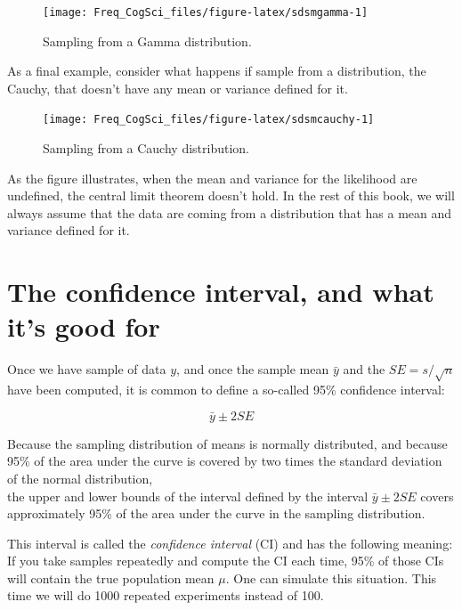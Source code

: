 \documentclass[12pt,]{krantz}
\begin{document}
\begin{figure}
\texttt{[image: Freq\_CogSci\_files/figure-latex/sdsmgamma-1]} \caption{Sampling from a Gamma distribution.}\label{fig:sdsmgamma}
\end{figure}

As a final example, consider what happens if sample from a distribution, the Cauchy, that doesn't have any mean or variance defined for it.

\begin{figure}
\texttt{[image: Freq\_CogSci\_files/figure-latex/sdsmcauchy-1]} \caption{Sampling from a Cauchy distribution.}\label{fig:sdsmcauchy}
\end{figure}

As the figure illustrates, when the mean and variance for the likelihood are undefined, the central limit theorem doesn't hold. In the rest of this book, we will always assume that the data are coming from a distribution that has a mean and variance defined for it.

\hypertarget{the-confidence-interval-and-what-its-good-for}{%
\section{The confidence interval, and what it's good for}\label{the-confidence-interval-and-what-its-good-for}}

Once we have sample of data \(y\), and once the sample mean \(\bar{y}\) and the \(SE = s/\sqrt{n}\) have been computed, it is common to define a so-called 95\% confidence interval:

\begin{equation}
\bar{y} \pm 2 SE
\end{equation}

Because the sampling distribution of means is normally distributed, and because 95\% of the area under the curve is covered by two times the standard deviation of the normal distribution,\\
the upper and lower bounds of the interval defined by the interval \(\bar{y} \pm 2 SE\) covers approximately 95\% of the area under the curve in the sampling distribution.

This interval is called the \emph{confidence interval} (CI) and has the following meaning: If you take samples repeatedly and compute the CI each time, 95\% of those CIs will contain the true population mean \(\mu\). One can simulate this situation. This time we will do 1000 repeated experiments instead of 100.
\end{document}
